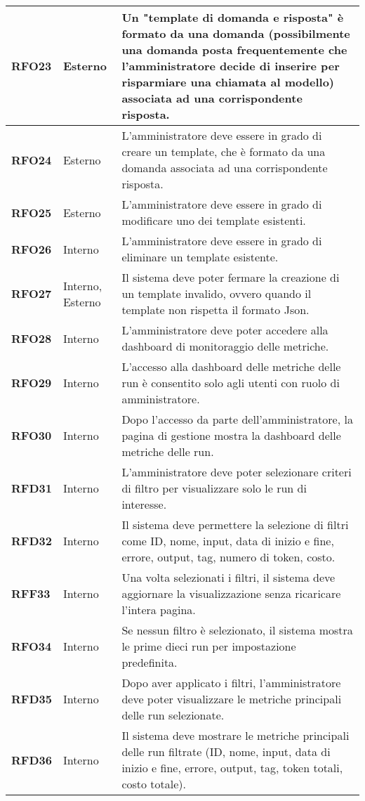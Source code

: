 \begin{longtable}{|>{\centering\arraybackslash}m{}|>{\centering\arraybackslash}m{}|>{\arraybackslash}m{}|}
	\hline
	\textbf{RFO23} & Esterno 			& Un "template di domanda e risposta" è formato da una domanda (possibilmente una domanda posta frequentemente che l'amministratore decide di inserire per risparmiare una chiamata al modello) associata ad una corrispondente risposta. \\
	\hline
	\textbf{RFO24} & Esterno 			& L'amministratore deve essere in grado di creare un template, che è formato da una domanda associata ad una corrispondente risposta. \\
	\hline
	\textbf{RFO25} & Esterno 			& L'amministratore deve essere in grado di modificare uno dei template esistenti. \\
	\hline
	\textbf{RFO26} & Interno 			& L'amministratore deve essere in grado di eliminare un template esistente. \\
	\hline
	\textbf{RFO27} & Interno, Esterno 	& Il sistema deve poter fermare la creazione di un template invalido, ovvero quando il template non rispetta il formato Json. \\
	\hline
	\textbf{RFO28} & Interno 			& L'amministratore deve poter accedere alla dashboard di monitoraggio delle metriche. \\
	\hline
	\textbf{RFO29} & Interno 			& L’accesso alla dashboard delle metriche delle run è consentito solo agli utenti con ruolo di amministratore. \\
	\hline
	\textbf{RFO30} & Interno 			& Dopo l’accesso da parte dell'amministratore, la pagina di gestione mostra la dashboard delle metriche delle run. \\
	\hline
	\textbf{RFD31} & Interno 			& L’amministratore deve poter selezionare criteri di filtro per visualizzare solo le run di interesse. \\
	\hline
	\textbf{RFD32} & Interno 			& Il sistema deve permettere la selezione di filtri come ID, nome, input, data di inizio e fine, errore, output, tag, numero di token, costo. \\
	\hline
	\textbf{RFF33} & Interno 			& Una volta selezionati i filtri, il sistema deve aggiornare la visualizzazione senza ricaricare l'intera pagina. \\
	\hline
	\textbf{RFO34} & Interno 			& Se nessun filtro è selezionato, il sistema mostra le prime dieci run per impostazione predefinita. \\
	\hline
	\textbf{RFD35} & Interno 			& Dopo aver applicato i filtri, l’amministratore deve poter visualizzare le metriche principali delle run selezionate. \\
	\hline
	\textbf{RFD36} & Interno 			& Il sistema deve mostrare le metriche principali delle run filtrate (ID, nome, input, data di inizio e fine, errore, output, tag, token totali, costo totale). \\

\end{longtable}
